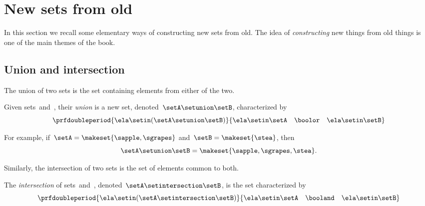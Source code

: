 
\section{New sets from old}

In this section we recall some elementary ways of constructing new sets from old.
%
The idea of \emph{constructing} new things from old things is one of the main themes of the book.

\subsection{Union and intersection}
The union of two sets is the set containing elements from either of the two.
\begin{ctdefinition}
    \label{def:union-of-sets}
    Given sets~\setA and~\setB, their \emph{union} is a new set, denoted~$\setA \setunion \setB$, characterized by
    \begin{equation}
        \prfdoubleperiod{
            \ela \setin(\setA \setunion \setB)
        }{
            \ela \setin\setA \quad \boolor \quad \ela \setin\setB
        }
    \end{equation}
\end{ctdefinition}

For example, if~$\setA = \makeset{ \sapple, \sgrapes }$ and~$\setB = \makeset{ \stea }$, then
\begin{equation}
    \setA \setunion \setB = \makeset{ \sapple, \sgrapes, \stea }.
\end{equation}


Similarly, the intersection of two sets is the set of elements common to both.

\begin{ctdefinition}
    \label{def:intersection-of-sets}
    The \emph{intersection} of sets~\setA and~\setB, denoted~$\setA \setintersection \setB$, is the set characterized by
    \begin{equation}
        \prfdoubleperiod{
            \ela \setin(\setA \setintersection \setB)
        }{
            \ela \setin\setA \quad \booland \quad \ela \setin\setB
        }
    \end{equation}
\end{ctdefinition}


